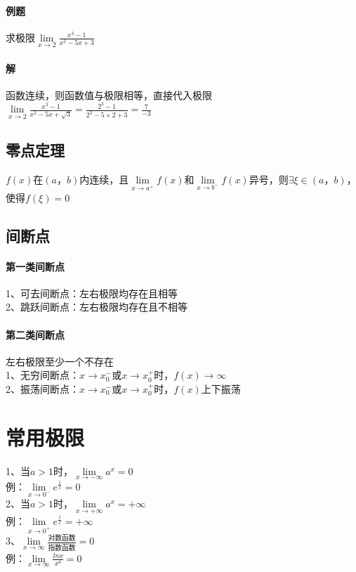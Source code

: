 \documentclass{article}
\begin{document}
\begin{flushleft}
	\paragraph{例题}
	求极限$\lim\limits_{x\to 2}\frac{x^3-1}{x^2-5x+3}$
	\paragraph{解}
	函数连续，则函数值与极限相等，直接代入极限\\
	$\lim\limits_{x\to 2}\frac{x^3-1}{x^2-5x+\sqrt3}=\frac{2^3-1}{2^2-5\times2+3}=\frac{7}{-3}$\\
	
	\subsection{零点定理}
	$f(x)$在$(a，b)$内连续，且$\lim\limits_{x\to a^+} f(x)$和$\lim\limits_{x\to b^-} f(x)$异号，则$\exists \xi \in (a，b)$，使得$f(\xi)=0$\\
	
	\subsection{间断点}
	
	\paragraph{第一类间断点}
	1、可去间断点：左右极限均存在且相等\\
	2、跳跃间断点：左右极限均存在且不相等\\
	\paragraph{第二类间断点}
	左右极限至少一个不存在\\
	1、无穷间断点：$x\to x_0^-$或$x\to x_0^+$时，$f(x)\to \infty$\\
	2、振荡间断点：$x\to x_0^-$或$x\to x_0^+$时，$f(x)$上下振荡\\
	
	\section{常用极限}
	
	1、当$a>1$时，$\lim\limits_{x\to-\infty}a^x=0$\\
	\qquad 例：$\lim\limits_{x\to 0^-}e^{\frac{1}{x}}=0$\\
	2、当$a>1$时，$\lim\limits_{x\to+\infty}a^x=+\infty$\\
	\qquad 例：$\lim\limits_{x\to 0^+}e^{\frac{1}{x}}=+\infty$\\
	3、$\lim\limits_{x\to\infty}\frac{\text{对数函数}}{\text{指数函数}}=0$\\
	\qquad 例：$\lim\limits_{x\to\infty}\frac{lnx}{x^a}=0$\\
	

\end{flushleft}
\end{document}

